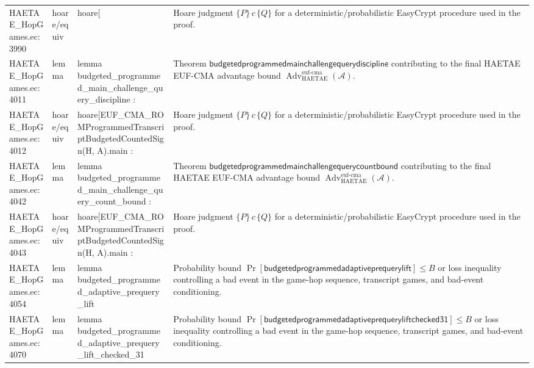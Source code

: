 \documentclass[10pt]{article}
\newcommand{\Adv}{\operatorname{Adv}}
\begin{document}
\begin{longtable}{L{0.11\textwidth}L{0.055\textwidth}L{0.385\textwidth}L{0.41\textwidth}}
HAETAE\_\allowbreak{}HopGames.\allowbreak{}ec:\allowbreak{}3990 & hoare/equiv & {\ttfamily\scriptsize hoare[} & Hoare judgment $\{P\}\,c\,\{Q\}$ for a deterministic/probabilistic EasyCrypt procedure used in the proof. \\
HAETAE\_\allowbreak{}HopGames.\allowbreak{}ec:\allowbreak{}4011 & lemma & {\ttfamily\scriptsize lemma budgeted\_\allowbreak{}programmed\_\allowbreak{}main\_\allowbreak{}challenge\_\allowbreak{}query\_\allowbreak{}discipline :} & Theorem $\mathsf{budgetedprogrammedmainchallengequerydiscipline}$ contributing to the final HAETAE EUF-CMA advantage bound $\Adv_{\mathrm{HAETAE}}^{\mathrm{euf\mbox{-}cma}}(\mathcal A)$. \\
HAETAE\_\allowbreak{}HopGames.\allowbreak{}ec:\allowbreak{}4012 & hoare/equiv & {\ttfamily\scriptsize hoare[EUF\_\allowbreak{}CMA\_\allowbreak{}ROMProgrammedTranscriptBudgetedCountedSign(H, A).main :} & Hoare judgment $\{P\}\,c\,\{Q\}$ for a deterministic/probabilistic EasyCrypt procedure used in the proof. \\
HAETAE\_\allowbreak{}HopGames.\allowbreak{}ec:\allowbreak{}4042 & lemma & {\ttfamily\scriptsize lemma budgeted\_\allowbreak{}programmed\_\allowbreak{}main\_\allowbreak{}challenge\_\allowbreak{}query\_\allowbreak{}count\_\allowbreak{}bound :} & Theorem $\mathsf{budgetedprogrammedmainchallengequerycountbound}$ contributing to the final HAETAE EUF-CMA advantage bound $\Adv_{\mathrm{HAETAE}}^{\mathrm{euf\mbox{-}cma}}(\mathcal A)$. \\
HAETAE\_\allowbreak{}HopGames.\allowbreak{}ec:\allowbreak{}4043 & hoare/equiv & {\ttfamily\scriptsize hoare[EUF\_\allowbreak{}CMA\_\allowbreak{}ROMProgrammedTranscriptBudgetedCountedSign(H, A).main :} & Hoare judgment $\{P\}\,c\,\{Q\}$ for a deterministic/probabilistic EasyCrypt procedure used in the proof. \\
HAETAE\_\allowbreak{}HopGames.\allowbreak{}ec:\allowbreak{}4054 & lemma & {\ttfamily\scriptsize lemma budgeted\_\allowbreak{}programmed\_\allowbreak{}adaptive\_\allowbreak{}prequery\_\allowbreak{}lift} & Probability bound $\Pr[\mathsf{budgetedprogrammedadaptiveprequerylift}]\le B$ or loss inequality controlling a bad event in the game-hop sequence, transcript games, and bad-event conditioning. \\
HAETAE\_\allowbreak{}HopGames.\allowbreak{}ec:\allowbreak{}4070 & lemma & {\ttfamily\scriptsize lemma budgeted\_\allowbreak{}programmed\_\allowbreak{}adaptive\_\allowbreak{}prequery\_\allowbreak{}lift\_\allowbreak{}checked\_\allowbreak{}31} & Probability bound $\Pr[\mathsf{budgetedprogrammedadaptiveprequeryliftchecked31}]\le B$ or loss inequality controlling a bad event in the game-hop sequence, transcript games, and bad-event conditioning. \\

\end{longtable}
\end{document}
